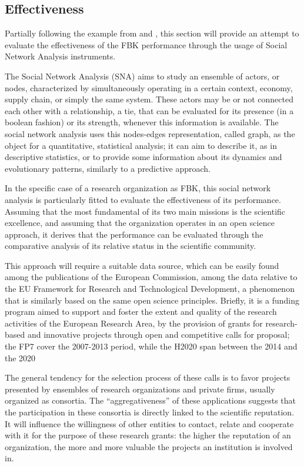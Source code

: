\subsection{Effectiveness}

Partially following the example from \citet{Giuliani2005} and \citet{Cantner2006}, this section will provide an attempt to evaluate the effectiveness of the FBK performance through the usage of Social Network Analysis instruments. 

The Social Network Analysis (SNA) aims to study an ensemble of actors, or nodes, characterized by simultaneously operating in a certain context, economy, supply chain, or simply the same system. These actors may be or not connected each other with a relationship, a tie, that can be evaluated for its presence (in a boolean fashion) or its strength, whenever this information is available. The social network analysis uses this nodes-edges representation, called graph, as the object for a quantitative, statistical analysis; it can aim to describe it, as in descriptive statistics, or to provide some information about its dynamics and evolutionary patterns, similarly to a predictive approach.

In the specific case of a research organization as FBK, this social network analysis is particularly fitted to evaluate the effectiveness of its performance. Assuming that the most fundamental of its two main missions is the scientific excellence, and assuming that the organization operates in an open science approach, it derives that the performance can be evaluated through the comparative analysis of its relative status in the scientific community.

This approach will require a suitable data source, which can be easily found among the publications of the European Commission, among the data relative to the EU Framework for Research and Technological Development, a phenomenon that is similarly based on the same open science principles. Briefly, it is a funding program aimed to support and foster the extent and quality of the research activities of the European Research Area, by the provision of grants for research-based and innovative projects through open and competitive calls for proposal; the FP7 cover the 2007-2013 period, while the H2020 span between the 2014 and the 2020

The general tendency for the selection process of these calls is to favor projects presented by ensembles of research organizations and private firms, usually organized as consortia. The \enquote{aggregativeness} of these applications suggests that the participation in these consortia is directly linked to the scientific reputation. It will influence the willingness of other entities to contact, relate and cooperate with it for the purpose of these research grants: the higher the reputation of an organization, the more and more valuable the projects an institution is involved in.

